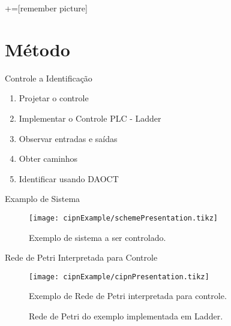
+=[remember picture]
\section{Método}

\begin{frame}{Controle a Identificação}
  \begin{enumerate}
   \item Projetar o controle\pause 
   \item Implementar o Controle \pause PLC - Ladder \pause
   \item Observar entradas e saídas\pause
   \item Obter caminhos\pause
   \item Identificar usando DAOCT 
\end{enumerate}
\end{frame}

\begin{frame}{Examplo de Sistema}
\begin{figure}[H]
  \centering
  \texttt{[image: cipnExample/schemePresentation.tikz]}
  \caption{Exemplo de sistema a ser controlado.}
  \label{fig:cipnexamplescheme}
\end{figure}
\end{frame}


\begin{frame}{Rede de Petri Interpretada para Controle}
\begin{figure}[H]
  \centering \texttt{[image: cipnExample/cipnPresentation.tikz]}
  \caption{Exemplo de Rede de Petri interpretada para controle.}
  \label{fig:cipnexample}
\end{figure}
\end{frame}

\begin{frame}
  \begin{figure}[H]
    \centering
 \caption{Rede de Petri do exemplo implementada em Ladder.}
  \label{fig:cipnexampleLadder}
\end{figure}
\end{frame}

